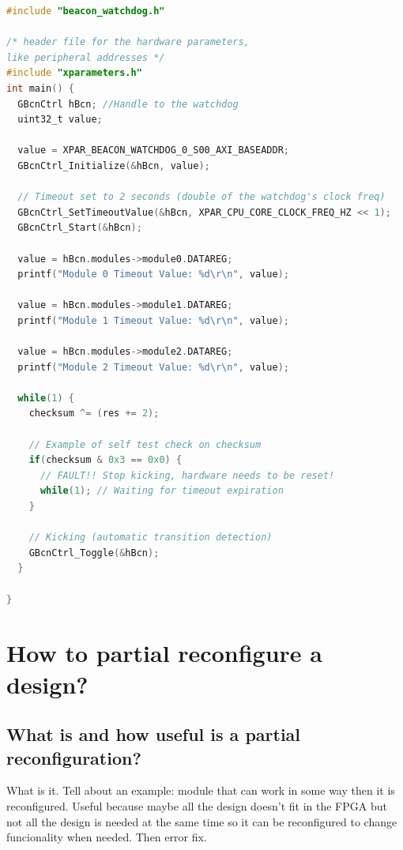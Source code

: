\begin{lstlisting}[language=C]
#include "beacon_watchdog.h"

/* header file for the hardware parameters, 
like peripheral addresses */
#include "xparameters.h" 
int main() {
  GBcnCtrl hBcn; //Handle to the watchdog
  uint32_t value;

  value = XPAR_BEACON_WATCHDOG_0_S00_AXI_BASEADDR;
  GBcnCtrl_Initialize(&hBcn, value);

  // Timeout set to 2 seconds (double of the watchdog's clock freq)
  GBcnCtrl_SetTimeoutValue(&hBcn, XPAR_CPU_CORE_CLOCK_FREQ_HZ << 1);
  GBcnCtrl_Start(&hBcn);

  value = hBcn.modules->module0.DATAREG;
  printf("Module 0 Timeout Value: %d\r\n", value);

  value = hBcn.modules->module1.DATAREG;
  printf("Module 1 Timeout Value: %d\r\n", value);

  value = hBcn.modules->module2.DATAREG;
  printf("Module 2 Timeout Value: %d\r\n", value);

  while(1) {
    checksum ^= (res += 2);

    // Example of self test check on checksum
    if(checksum & 0x3 == 0x0) {
      // FAULT!! Stop kicking, hardware needs to be reset!
      while(1); // Waiting for timeout expiration
    }

    // Kicking (automatic transition detection)
    GBcnCtrl_Toggle(&hBcn); 
  }

}
\end{lstlisting}



\section{How to partial reconfigure a design?}
\subsection{What is and how useful is a partial reconfiguration?}

What is it. Tell about an example: module that can work in some way then it is reconfigured. Useful because maybe all the design doesn't fit in the FPGA but not all the design is needed at the same time so it can be reconfigured to change funcionality when needed. %
Then error fix.

